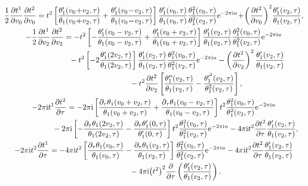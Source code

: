 \documentclass[10pt,a4paper]{amsart}
\numberwithin{equation}{section}
\begin{document}
\begin{gather*}
\frac{1}{2}\frac{\partial t^1}{\partial v_0}\frac{\partial t^2}{\partial v_0}=t^2\left[\frac{\theta_1^{\prime}(v_0\!+\!v_2,\tau)}{\theta_1(v_0\!+\!v_2,\tau)} +\frac{\theta_1^{\prime}(v_0\!-\!v_2,\tau)}{\theta_1(v_0\!-\!v_2,\tau)}\right] \frac{\theta_1^{\prime}(v_0,\tau)}{\theta_1(v_0,\tau)} \frac{\theta_1^2(v_0,\tau)}{\theta_1^2(v_2,\tau)}{\rm e}^{-2\pi {\rm i} u}\!
+\!\left(\frac{\partial t^2}{\partial v_0}\right)^2\!\frac{\theta_1^{\prime}(v_2,\tau)}{\theta_1(v_2,\tau)},
\\
-\frac{1}{2}\frac{\partial t^1}{\partial v_2}\frac{\partial t^2}{\partial v_2}=-t^2\left[ - \frac{\theta_1^{\prime}(v_0-v_2,\tau)}{\theta_1(v_0-v_2,\tau)}
+\frac{\theta_1^{\prime}(v_0+v_2,\tau)}{\theta_1(v_0+v_2,\tau)}\right] \frac{\theta_1^{\prime}(v_2,\tau)}{\theta_1(v_2,\tau)} \frac{\theta_1^2(v_0,\tau)}{\theta_1^2(v_2,\tau)}{\rm e}^{-2\pi {\rm i} u}
\\ \hphantom{-\frac{1}{2}\frac{\partial t^1}{\partial v_2}\frac{\partial t^2}{\partial v_2}=}
{}-t^2\left[-2\frac{\theta_1^{\prime}(2v_2,\tau)}{\theta_1(2v_2,\tau)}\right] \frac{\theta_1^{\prime}(v_2,\tau)}{\theta_1(v_2,\tau)} \frac{\theta_1^2(v_0,\tau)}{\theta_1^2(v_2,\tau)}{\rm e}^{-2\pi {\rm i} u}
-\left(\frac{\partial t^2}{\partial v_2}\right)^2\frac{\theta_1^{\prime}(v_2,\tau)}{\theta_1(v_2,\tau)}
\\ \hphantom{-\frac{1}{2}\frac{\partial t^1}{\partial v_2}\frac{\partial t^2}{\partial v_2}=-t^2\bigg[}
{}-t^2\frac{\partial t^2}{\partial v_2}\left[\frac{\theta_1^{\prime\prime}(v_2,\tau)}{\theta_1(v_2,\tau)} -\frac{\theta_1^{\prime^2}(v_2,\tau)}{\theta_1^2(v_2,\tau)}\right],
\\
-2\pi {\rm i}t^1\frac{\partial t^2}{\partial \tau}=-2\pi {\rm i}\left[\frac{\partial_{\tau}\theta_1(v_0+v_2,\tau)}{\theta_1(v_0+v_2,\tau)} +\frac{\partial_{\tau}\theta_1(v_0-v_2,\tau)}{\theta_1(v_0-v_2,\tau)}\right]t^2 \frac{\theta_1^2(v_0,\tau)}{\theta_1^2(v_2,\tau)}{\rm e}^{-2\pi {\rm i} u}
\\ \hphantom{-2\pi {\rm i}t^1\frac{\partial t^2}{\partial \tau}=}
{}-2\pi {\rm i}\left[-\frac{\partial_{\tau}\theta_1(2v_2,\tau)}{\theta_1(2v_2,\tau)} -\frac{\partial_{\tau}\theta_1^{\prime}(0,\tau)}{\theta_1^{\prime}(0,\tau)}\right]t^2 \frac{\theta_1^2(v_0,\tau)}{\theta_1^2(v_2,\tau)}{\rm e}^{-2\pi {\rm i} u}
-4\pi {\rm i}t^2\frac{\partial t^2}{\partial \tau}\frac{\theta_1^{\prime}(v_2,\tau)}{\theta_1(v_2,\tau)},
\\
-2\pi {\rm i}t^2\frac{\partial t^1}{\partial \tau}=-4\pi {\rm i}t^2\left[\frac{\partial_{\tau}\theta_1(v_0,\tau)}{\theta_1(v_0,\tau)} -\frac{\partial_{\tau}\theta_1(v_2,\tau)}{\theta_1(v_2,\tau)}\right] \frac{\theta_1^2(v_0,\tau)}{\theta_1^2(v_2,\tau)}{\rm e}^{-2\pi {\rm i} u}
-4\pi {\rm i}t^2\frac{\partial t^2}{\partial \tau}\frac{\theta_1^{\prime}(v_2,\tau)}{\theta_1(v_2,\tau)}
\\ \hphantom{-2\pi {\rm i}t^2\frac{\partial t^1}{\partial \tau}=}
-4\pi {\rm i}\big(t^2\big)^2\frac{\partial}{\partial \tau}\left(\frac{\theta_1^{\prime}(v_2,\tau)}{\theta_1(v_2,\tau)}\right).
\end{gather*}
\end{document}
